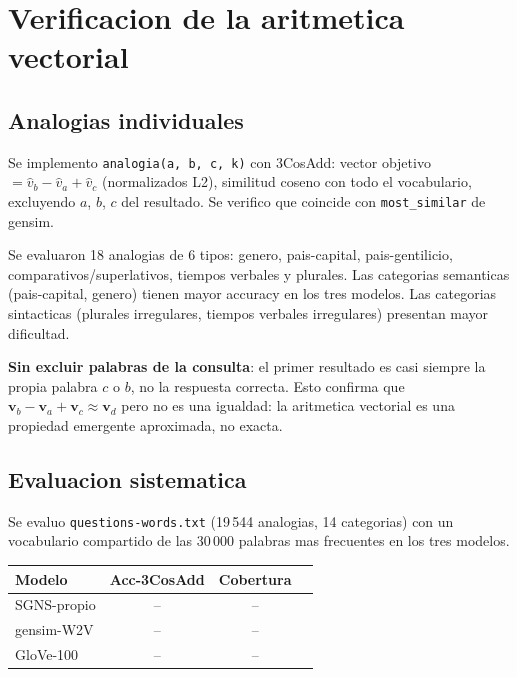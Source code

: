 \documentclass[11pt,a4paper]{article}
\begin{document}
\section{Verificacion de la aritmetica vectorial}

\subsection{Analogias individuales}

Se implemento \texttt{analogia(a, b, c, k)} con 3CosAdd: vector objetivo
$= \hat{v}_b - \hat{v}_a + \hat{v}_c$ (normalizados L2), similitud coseno
con todo el vocabulario, excluyendo $a$, $b$, $c$ del resultado.
Se verifico que coincide con \texttt{most\_similar} de gensim.

Se evaluaron 18 analogias de 6 tipos: genero, pais-capital, pais-gentilicio,
comparativos/superlativos, tiempos verbales y plurales.
Las categorias semanticas (pais-capital, genero) tienen mayor accuracy en los
tres modelos. Las categorias sintacticas (plurales irregulares, tiempos verbales
irregulares) presentan mayor dificultad.

\textbf{Sin excluir palabras de la consulta}: el primer resultado es casi siempre
la propia palabra $c$ o $b$, no la respuesta correcta. Esto confirma que
$\mathbf{v}_b - \mathbf{v}_a + \mathbf{v}_c \approx \mathbf{v}_d$ pero no es
una igualdad: la aritmetica vectorial es una propiedad emergente aproximada, no exacta.

\subsection{Evaluacion sistematica}

Se evaluo \texttt{questions-words.txt} (19\,544 analogias, 14 categorias) con un
vocabulario compartido de las 30\,000 palabras mas frecuentes en los tres modelos.

\begin{center}
\small
\begin{tabular}{lccc}
\toprule
Modelo & Acc-3CosAdd & Cobertura \\
\midrule
SGNS-propio  & -- & -- \\
gensim-W2V   & -- & -- \\
GloVe-100    & -- & -- \\
\bottomrule
\end{tabular}
\end{center}
\end{document}
